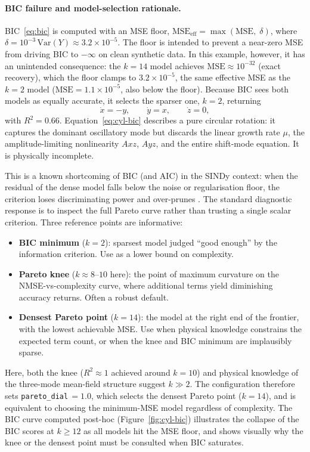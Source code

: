 \documentclass[12pt]{article}
\begin{document}
\paragraph{BIC failure and model-selection rationale.}
BIC~\eqref{eq:bic} is computed with an MSE floor,
$\mathrm{MSE}_{\mathrm{eff}} = \max(\mathrm{MSE},\; \delta)$,
where $\delta = 10^{-3}\,\mathrm{Var}(Y) \approx 3.2\times10^{-5}$.
The floor is intended to prevent a near-zero MSE from driving BIC to
$-\infty$ on clean synthetic data.  In this example, however, it has an
unintended consequence: the $k=14$ model achieves
$\mathrm{MSE} \approx 10^{-32}$ (exact recovery), which the floor clamps to
$3.2\times10^{-5}$, the same effective MSE as the $k=2$ model
($\mathrm{MSE} = 1.1\times10^{-5}$, also below the floor).
Because BIC sees both models as equally accurate, it selects the sparser
one, $k=2$, returning
\begin{equation}
  \dot{x} = -y, \qquad \dot{y} = x, \qquad \dot{z} = 0,
  \label{eq:cyl-bic}
\end{equation}
with $R^{2} = 0.66$.  Equation~\eqref{eq:cyl-bic} describes a pure
circular rotation: it captures the dominant oscillatory mode but discards
the linear growth rate $\mu$, the amplitude-limiting nonlinearity $Axz$,
$Ayz$, and the entire shift-mode equation.  It is physically incomplete.

This is a known shortcoming of BIC (and AIC) in the SINDy context: when
the residual of the dense model falls below the noise or regularisation
floor, the criterion loses discriminating power and over-prunes
\cite{Brunton2016}.  The standard diagnostic response is to inspect the
full Pareto curve rather than trusting a single scalar criterion.  Three
reference points are informative:
\begin{itemize}
  \item \textbf{BIC minimum} ($k=2$): sparsest model judged ``good enough''
        by the information criterion.  Use as a lower bound on complexity.
  \item \textbf{Pareto knee} ($k \approx 8$--$10$ here): the point of
        maximum curvature on the NMSE-vs-complexity curve, where additional
        terms yield diminishing accuracy returns.  Often a robust default.
  \item \textbf{Densest Pareto point} ($k=14$): the model at the right end
        of the frontier, with the lowest achievable MSE.  Use when physical
        knowledge constrains the expected term count, or when the knee and
        BIC minimum are implausibly sparse.
\end{itemize}
Here, both the knee ($R^{2} \approx 1$ achieved around $k=10$) and physical
knowledge of the three-mode mean-field structure suggest $k\gg 2$.
The configuration therefore sets \texttt{pareto\_dial}\,$= 1.0$, which
selects the densest Pareto point ($k=14$), and is equivalent to choosing
the minimum-MSE model regardless of complexity.  The BIC curve computed
post-hoc (Figure~\ref{fig:cyl-bic}) illustrates the collapse of the BIC
scores at $k \geq 12$ as all models hit the MSE floor, and shows visually
why the knee or the densest point must be consulted when BIC saturates.
\end{document}
